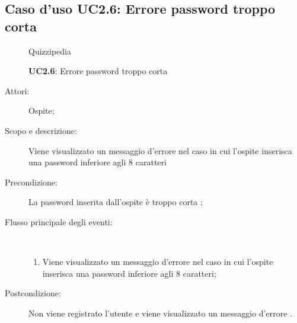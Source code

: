 \subsection{Caso d'uso UC2.6: Errore password troppo corta}
	\begin{figure}[H]
		\centering
		\begin{resizedtikzpicture}{\textwidth}
		\begin{umlsystem}[x=0, fill=lightgray!20]{Quizzipedia}
		\end{umlsystem}
		\end{resizedtikzpicture}
		\caption{\textbf{UC2.6}: Errore password troppo corta}
		\label{UC2.6}
	\end{figure}
\begin{description}
\item[Attori:] Ospite;
\item[Scopo e descrizione:] Viene visualizzato un messaggio d'errore nel caso in cui l'ospite inserisca una password inferiore agli 8 caratteri
      \item[Precondizione:] La password inserita dall'ospite è troppo corta
;

        \item[Flusso principale degli eventi:] \ 
 \begin{enumerate}
          \item Viene visualizzato un messaggio d'errore nel caso in cui l'ospite inserisca una password inferiore agli 8 caratteri;

      \end{enumerate}
    \item[Postcondizione:] Non viene registrato l'utente e viene visualizzato un messaggio d'errore
.
  \end{description}
\hypertarget{UC2.7}{}
